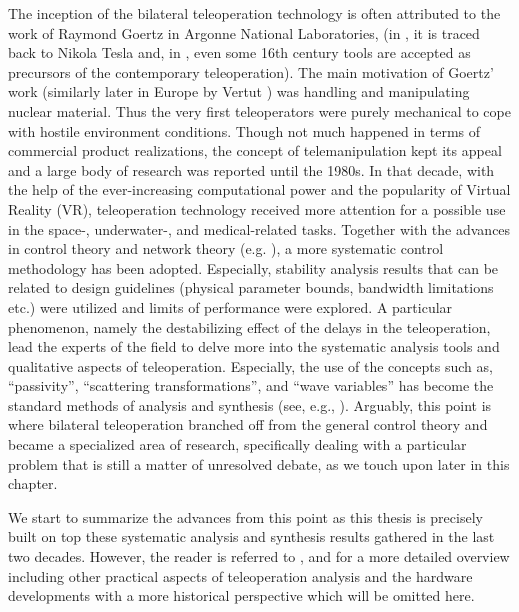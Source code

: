 The inception of the bilateral teleoperation technology is often attributed to the work 
of Raymond Goertz in Argonne National Laboratories, \cite{goertz} (in \cite{basanezsuarez}, 
it is traced back to Nikola Tesla and, in \cite{sheridan89}, even some 16th century tools are accepted as precursors 
of the contemporary  teleoperation). The main motivation of Goertz' work (similarly later in Europe 
by Vertut \cite{vertutcoiffet}) was handling and manipulating nuclear material. Thus the very 
first teleoperators were purely mechanical to cope with hostile environment conditions. Though not much 
happened in terms of commercial product realizations, the concept of telemanipulation kept its appeal 
and a large body of research was reported until the 1980s. In that decade, with the help of the 
ever-increasing computational power and the popularity of Virtual Reality (VR), teleoperation 
technology received more attention for a possible use in the space-, underwater-, and medical-related 
tasks. Together with the advances in control theory and network theory (e.g. \cite{miyazaki,furuta}), 
a more systematic control methodology has been adopted. Especially, stability analysis results that can be 
related to design guidelines (physical parameter bounds, bandwidth limitations etc.) were utilized
and limits of performance were explored. A particular phenomenon, namely the destabilizing effect 
of the delays in the teleoperation, lead the experts of the field to delve more into the systematic 
analysis tools and qualitative aspects of teleoperation. Especially, the use of the concepts such as, 
\enquote{passivity}, \enquote{scattering transformations}, and \enquote{wave variables} has become the 
standard methods of analysis and synthesis (see, e.g., \cite{hannaford89,andersonspong,nieslotine}). 
Arguably, this point is where bilateral teleoperation branched off from the general control theory
and became a specialized area of research, specifically dealing with a particular problem that is still
a matter of unresolved debate, as we touch upon later in this chapter.

We start to summarize the advances from this point as this thesis is precisely built on top these systematic 
analysis and synthesis results gathered in the last two decades. However, the reader is referred to 
\cite{hokayemspong,burdea}, and \cite{sheridan89} for a more detailed overview including other practical 
aspects of teleoperation analysis and the hardware developments with a more historical perspective which 
will be omitted here. 


